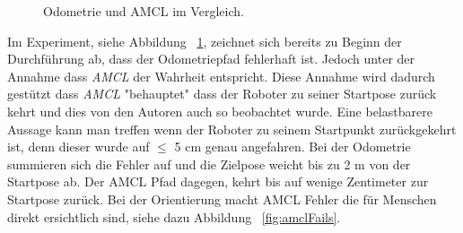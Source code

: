 \documentclass[11pt,a4paper]{article}
\begin{document}
{\begin{figure}[h]
	\centering
	\par\medskip
	\centering
	\par\medskip
	\caption{ Odometrie und AMCL im Vergleich. \label{fig:odo_amcl}}
\end{figure}

	Im Experiment, siehe Abbildung ~\ref{fig:odo_amcl}, zeichnet sich bereits zu Beginn der Durchf\"uhrung ab, dass der Odometriepfad fehlerhaft ist. Jedoch unter der Annahme dass \textit{AMCL} der Wahrheit entspricht. Diese Annahme wird dadurch gestützt dass \textit{AMCL} "behauptet" dass der Roboter zu seiner Startpose zurück kehrt und dies von den Autoren auch so beobachtet wurde.  
	Eine belastbarere Aussage kann man treffen wenn der Roboter zu seinem Startpunkt zurückgekehrt ist, denn dieser wurde auf $\leq$ 5 cm genau angefahren. Bei der Odometrie summieren sich die Fehler auf und die Zielpose weicht bis zu 2 m von der Startpose ab. 
	Der AMCL Pfad dagegen, kehrt bis auf wenige Zentimeter zur Startpose zur\"uck. Bei der Orientierung macht AMCL Fehler die für Menschen direkt ersichtlich sind, siehe dazu Abbildung ~\ref{fig:amclFails}.

}
\end{document}

